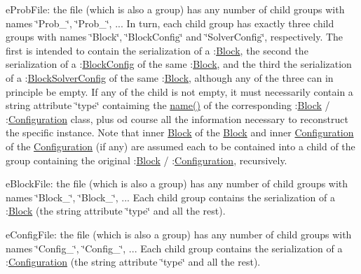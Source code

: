 \begin{DoxyItemize}
\item e\+Prob\+File\+: the file (which is also a group) has any number of child groups with names \char`\"{}\+Prob\+\_\char`\"{}, \char`\"{}\+Prob\+\_\char`\"{}, ... In turn, each child group has exactly three child groups with names \char`\"{}\+Block\char`\"{}, \char`\"{}\+Block\+Config\char`\"{} and \char`\"{}\+Solver\+Config\char`\"{}, respectively. The first is intended to contain the serialization of a \+:\mbox{\hyperlink{class_s_m_spp__di__unipi__it_1_1_block}{Block}}, the second the serialization of a \+:\mbox{\hyperlink{class_s_m_spp__di__unipi__it_1_1_block_config}{Block\+Config}} of the same \+:\mbox{\hyperlink{class_s_m_spp__di__unipi__it_1_1_block}{Block}}, and the third the serialization of a \+:\mbox{\hyperlink{class_s_m_spp__di__unipi__it_1_1_block_solver_config}{Block\+Solver\+Config}} of the same \+:\mbox{\hyperlink{class_s_m_spp__di__unipi__it_1_1_block}{Block}}, although any of the three can in principle be empty. If any of the child is not empty, it must necessarily contain a string attribute \char`\"{}type\char`\"{} contaiming the \mbox{\hyperlink{class_s_m_spp__di__unipi__it_1_1_configuration_a738e9dfd6e00507da219e4bd5a3f6be9}{name()}} of the corresponding \+:\mbox{\hyperlink{class_s_m_spp__di__unipi__it_1_1_block}{Block}} / \+:\mbox{\hyperlink{class_s_m_spp__di__unipi__it_1_1_configuration}{Configuration}} class, plus od course all the information necessary to reconstruct the specific instance. Note that inner \mbox{\hyperlink{class_s_m_spp__di__unipi__it_1_1_block}{Block}} of the \mbox{\hyperlink{class_s_m_spp__di__unipi__it_1_1_block}{Block}} and inner \mbox{\hyperlink{class_s_m_spp__di__unipi__it_1_1_configuration}{Configuration}} of the \mbox{\hyperlink{class_s_m_spp__di__unipi__it_1_1_configuration}{Configuration}} (if any) are assumed each to be contained into a child of the group containing the original \+:\mbox{\hyperlink{class_s_m_spp__di__unipi__it_1_1_block}{Block}} / \+:\mbox{\hyperlink{class_s_m_spp__di__unipi__it_1_1_configuration}{Configuration}}, recursively.
\item e\+Block\+File\+: the file (which is also a group) has any number of child groups with names \char`\"{}\+Block\+\_\char`\"{}, \char`\"{}\+Block\+\_\char`\"{}, ... Each child group contains the serialization of a \+:\mbox{\hyperlink{class_s_m_spp__di__unipi__it_1_1_block}{Block}} (the string attribute \char`\"{}type\char`\"{} and all the rest).
\item e\+Config\+File\+: the file (which is also a group) has any number of child groups with names \char`\"{}\+Config\+\_\char`\"{}, \char`\"{}\+Config\+\_\char`\"{}, ... Each child group contains the serialization of a \+:\mbox{\hyperlink{class_s_m_spp__di__unipi__it_1_1_configuration}{Configuration}} (the string attribute \char`\"{}type\char`\"{} and all the rest).
\end{DoxyItemize}

